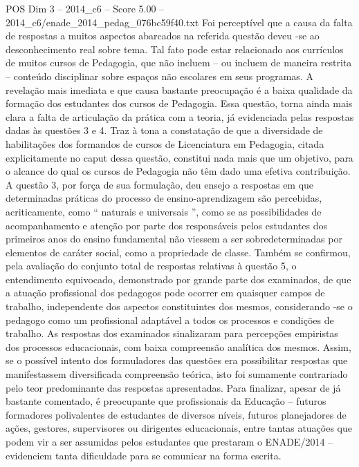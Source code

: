 \begin{textsample}{POS Dim 3 – 2014\_c6 – Score 5.00 – 2014\_c6/enade\_2014\_pedag\_076bc59f40.txt}
Foi perceptível que a causa da falta de respostas a muitos aspectos abarcados na referida questão deveu -se ao desconhecimento real sobre tema.
Tal fato pode estar relacionado aos currículos de muitos cursos de Pedagogia, que não incluem – ou incluem de maneira restrita – conteúdo disciplinar sobre espaços não escolares em seus programas.
A revelação mais imediata e que causa bastante preocupação é a baixa qualidade da formação dos estudantes dos cursos de Pedagogia.
Essa questão, torna ainda mais clara a falta de articulação da prática com a teoria, já evidenciada pelas respostas dadas às questões 3 e 4.
Traz à tona a constatação de que a diversidade de habilitações dos formandos de cursos de Licenciatura em Pedagogia, citada explicitamente no caput dessa questão, constitui nada mais que um objetivo, para o alcance do qual os cursos de Pedagogia não têm dado uma efetiva contribuição.
A questão 3, por força de sua formulação, deu ensejo a respostas em que determinadas práticas do processo de ensino-aprendizagem são percebidas, acriticamente, como “ naturais e universais ”, como se as possibilidades de acompanhamento e atenção por parte dos responsáveis pelos estudantes dos primeiros anos do ensino fundamental não viessem a ser sobredeterminadas por elementos de caráter social, como a propriedade de classe.
Também se confirmou, pela avaliação do conjunto total de respostas relativas à questão 5, o entendimento equivocado, demonstrado por grande parte dos examinados, de que a atuação profissional dos pedagogos pode ocorrer em quaisquer campos de trabalho, independente dos aspectos constituintes dos mesmos, considerando -se o pedagogo como um profissional adaptável a todos os processos e condições de trabalho.
As respostas dos examinados sinalizaram para percepções empiristas dos processos educacionais, com baixa compreensão analítica dos mesmos.
Assim, se o possível intento dos formuladores das questões era possibilitar respostas que manifestassem diversificada compreensão teórica, isto foi sumamente contrariado pelo teor predominante das respostas apresentadas.
Para finalizar, apesar de já bastante comentado, é preocupante que profissionais da Educação – futuros formadores polivalentes de estudantes de diversos níveis, futuros planejadores de ações, gestores, supervisores ou dirigentes educacionais, entre tantas atuações que podem vir a ser assumidas pelos estudantes que prestaram o ENADE/2014 – evidenciem tanta dificuldade para se comunicar na forma escrita.

\end{textsample}

